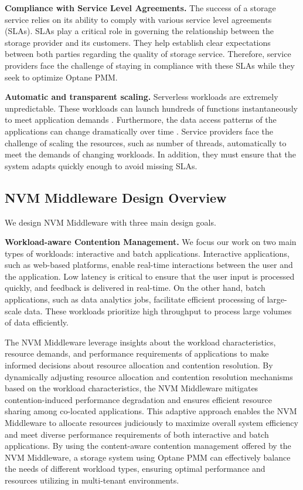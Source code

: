 \textbf{Compliance with Service Level Agreements.} The success of a storage service relies on its ability to comply with various service level agreements (SLAs). SLAs play a critical role in governing the relationship between the storage provider and its customers. They help establish clear expectations between both parties regarding the quality of storage service. Therefore, service providers face the challenge of staying in compliance with these SLAs while they seek to optimize Optane PMM. 

\textbf{Automatic and transparent scaling.} Serverless workloads are extremely unpredictable. These workloads can launch hundreds of functions instantaneously to meet application demands \cite{klimovic2018understanding}. Furthermore, the data access patterns of the applications can change dramatically over time \cite{romero2021faat,wu2019autoscaling}. Service providers face the challenge of scaling the resources, such as number of threads, automatically to meet the demands of changing workloads. In addition, they must ensure that the system adapts quickly enough to avoid missing SLAs.


\subsection{NVM Middleware Design Overview}

We design NVM Middleware with three main design goals.

\textbf{Workload-aware Contention Management.} We focus our work on two main types of workloads: interactive and batch applications. Interactive applications, such as web-based platforms, enable real-time interactions between the user and the application. Low latency is critical to ensure that the user input is processed quickly, and feedback is delivered in real-time. On the other hand, batch applications, such as data analytics jobs, facilitate efficient processing of large-scale data. These workloads prioritize high throughput to process large volumes of data efficiently.

The NVM Middleware leverage insights about the workload characteristics, resource demands, and performance requirements of applications to make informed decisions about resource allocation and contention resolution. By dynamically adjusting resource allocation and contention resolution mechanisms based on the workload characteristics, the NVM Middleware mitigates contention-induced performance degradation and ensures efficient resource sharing among co-located applications. This adaptive approach enables the NVM Middleware to allocate resources judiciously to maximize overall system efficiency and meet diverse performance requirements of both interactive and batch applications. By using the content-aware contention management offered by the NVM Middleware, a storage system using Optane PMM can effectively balance the needs of different workload types, ensuring optimal performance and resources utilizing in multi-tenant environments.

